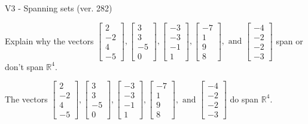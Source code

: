 \begin{exercise}
  \begin{exerciseTitle}V3 - Spanning sets (ver. 282)\end{exerciseTitle}
  \begin{exerciseStatement}
    Explain why the vectors \(\left[\begin{array}{r}
2 \\
-2 \\
4 \\
-5
\end{array}\right] , \left[\begin{array}{r}
3 \\
3 \\
-5 \\
0
\end{array}\right] , \left[\begin{array}{r}
-3 \\
-3 \\
-1 \\
1
\end{array}\right] , \left[\begin{array}{r}
-7 \\
1 \\
9 \\
8
\end{array}\right] , \text{ and } \left[\begin{array}{r}
-4 \\
-2 \\
-2 \\
-3
\end{array}\right]\) span or don't span \(\mathbb{R}^4\). 
	


  \end{exerciseStatement}
  \begin{exerciseAnswer}
   The vectors \(\left[\begin{array}{r}
2 \\
-2 \\
4 \\
-5
\end{array}\right] , \left[\begin{array}{r}
3 \\
3 \\
-5 \\
0
\end{array}\right] , \left[\begin{array}{r}
-3 \\
-3 \\
-1 \\
1
\end{array}\right] , \left[\begin{array}{r}
-7 \\
1 \\
9 \\
8
\end{array}\right] , \text{ and } \left[\begin{array}{r}
-4 \\
-2 \\
-2 \\
-3
\end{array}\right]\) 
  	 do  
	span \(\mathbb{R}^4\).
  



\end{exerciseAnswer}
\end{exercise}
